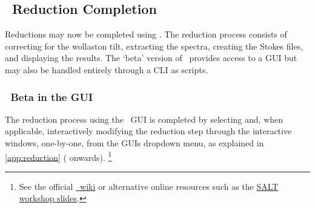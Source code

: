 \subsection[\textsc{polsalt} Reduction Completion]{\polsalt\ Reduction Completion} \label{subsec:reduc_com}

Reductions may now be completed using \polsalt.
The reduction process consists of correcting for the wollaston tilt, extracting the spectra, creating the Stokes files, and displaying the results.
The `beta' version of \polsalt\ provides access to a \gls{GUI} but may also be handled entirely through a \gls{CLI} as scripts.

\subsubsection{\polsalt\ Beta in the \gls{GUI}}

The reduction process using the \polsalt\ \gls{GUI} is completed by selecting and, when applicable, interactively modifying the reduction step through the interactive windows, one-by-one, from the \glspl{GUI} dropdown menu, as explained in \autoref{app:reduction} ( onwards).%
\footnote{See the official \href{https://github.com/saltastro/polsalt/wiki}{\polsalt\ wiki} or alternative online resources such as the \href{https://saltworkshop2022.salt.ac.za/wp-content/uploads/2022/11/DG_polsalt_SALT_workshop_2022_finalversion.pdf}{\gls{SALT} workshop slides}.}



